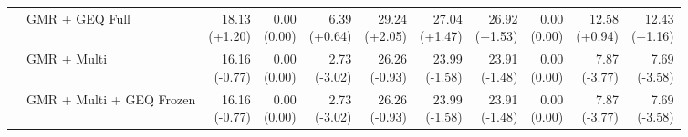 \documentclass{article}
\begin{document}
{\begin{tabular}{llrrrrrrrrr}
 & GMR + GEQ Full & \shortstack{18.13 \\ {\scriptsize\textcolor{Gain}{(+1.20)}}} & \shortstack{0.00 \\ {\scriptsize\textcolor{Zero}{(0.00)}}} & \shortstack{6.39 \\ {\scriptsize\textcolor{Gain}{(+0.64)}}} & \shortstack{29.24 \\ {\scriptsize\textcolor{Gain}{(+2.05)}}} & \shortstack{27.04 \\ {\scriptsize\textcolor{Gain}{(+1.47)}}} & \shortstack{26.92 \\ {\scriptsize\textcolor{Gain}{(+1.53)}}} & \shortstack{0.00 \\ {\scriptsize\textcolor{Zero}{(0.00)}}} & \shortstack{12.58 \\ {\scriptsize\textcolor{Gain}{(+0.94)}}} & \shortstack{12.43 \\ {\scriptsize\textcolor{Gain}{(+1.16)}}} \\
 & GMR + Multi & \shortstack{16.16 \\ {\scriptsize\textcolor{Loss}{(-0.77)}}} & \shortstack{0.00 \\ {\scriptsize\textcolor{Zero}{(0.00)}}} & \shortstack{2.73 \\ {\scriptsize\textcolor{Loss}{(-3.02)}}} & \shortstack{26.26 \\ {\scriptsize\textcolor{Loss}{(-0.93)}}} & \shortstack{23.99 \\ {\scriptsize\textcolor{Loss}{(-1.58)}}} & \shortstack{23.91 \\ {\scriptsize\textcolor{Loss}{(-1.48)}}} & \shortstack{0.00 \\ {\scriptsize\textcolor{Zero}{(0.00)}}} & \shortstack{7.87 \\ {\scriptsize\textcolor{Loss}{(-3.77)}}} & \shortstack{7.69 \\ {\scriptsize\textcolor{Loss}{(-3.58)}}} \\
 & GMR + Multi + GEQ Frozen & \shortstack{16.16 \\ {\scriptsize\textcolor{Loss}{(-0.77)}}} & \shortstack{0.00 \\ {\scriptsize\textcolor{Zero}{(0.00)}}} & \shortstack{2.73 \\ {\scriptsize\textcolor{Loss}{(-3.02)}}} & \shortstack{26.26 \\ {\scriptsize\textcolor{Loss}{(-0.93)}}} & \shortstack{23.99 \\ {\scriptsize\textcolor{Loss}{(-1.58)}}} & \shortstack{23.91 \\ {\scriptsize\textcolor{Loss}{(-1.48)}}} & \shortstack{0.00 \\ {\scriptsize\textcolor{Zero}{(0.00)}}} & \shortstack{7.87 \\ {\scriptsize\textcolor{Loss}{(-3.77)}}} & \shortstack{7.69 \\ {\scriptsize\textcolor{Loss}{(-3.58)}}} \\

\end{tabular}}
\end{document}
